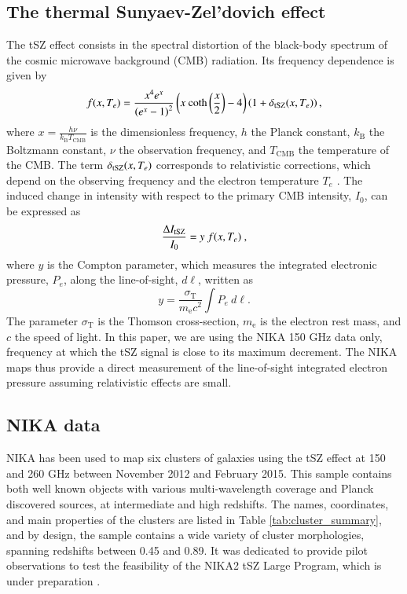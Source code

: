 \documentclass[twocolumn,traditabstract]{aa}
\begin{document}
\subsection{The thermal Sunyaev-Zel'dovich effect}
The tSZ effect consists in the spectral distortion of the black-body spectrum of the cosmic microwave background (CMB) radiation. Its frequency dependence is given by \citep{birkinshaw1999}
\begin{equation}
	f(x, T_e) = \frac{x^4 e^x}{\left(e^x-1\right)^2} \left(x \ \mathrm{coth}\left(\frac{x}{2}\right) - 4\right) \left(1 + \delta_{\rm tSZ}(x, T_e) \right),
	\label{eq:sz_f_x}
\end{equation}
where $x = \frac{h \nu}{k_{\mathrm{B}} T_{\mathrm{CMB}}}$ is the dimensionless frequency, $h$ the Planck constant, $k_{\mathrm{B}}$ the Boltzmann constant, $\nu$ the observation frequency, and $T_{\mathrm{CMB}}$ the temperature of the CMB. The term $\delta_{\rm tSZ}(x,T_e)$ corresponds to relativistic corrections, which depend on the observing frequency and the electron temperature $T_e$ \citep[see, e.g.][]{Itoh2003}. The induced change in intensity with respect to the primary CMB intensity, $I_0$, can be expressed as
\begin{equation}
	\frac{\Delta I_{\rm tSZ}}{I_0} = y \ f(x, T_e) \ ,
\label{eq:deltaI}
\end{equation}
where $y$ is the Compton parameter, which measures the integrated electronic pressure, $P_{e}$, along the line-of-sight, $d\ell$, written as
   \begin{equation}
	y = \frac{\sigma_{\mathrm{T}}}{m_{\mathrm{e}} c^2} \int P_{e} \ d\ell.
	\label{eq:y_compton}
   \end{equation}
The parameter $\sigma_{\mathrm{T}}$ is the Thomson cross-section, $m_{\mathrm{e}}$ is the electron rest mass, and $c$ the speed of light. In this paper, we are using the NIKA 150 GHz data only, frequency at which the tSZ signal is close to its maximum decrement. The NIKA maps thus provide a direct measurement of the line-of-sight integrated electron pressure assuming relativistic effects are small.

\subsection{NIKA data}\label{sec:NIKA_Data}
NIKA has been used to map six clusters of galaxies using the tSZ effect at 150 and 260 GHz between November 2012 and February 2015. This sample contains both well known objects with various multi-wavelength coverage and Planck discovered sources, at intermediate and high redshifts. The names, coordinates, and main properties of the clusters are listed in Table \ref{tab:cluster_summary}, and by design, the sample contains a wide variety of cluster morphologies, spanning redshifts between 0.45 and 0.89. It was dedicated to provide pilot observations to test the feasibility of the NIKA2 \citep{NIKA2017} tSZ Large Program, which is under preparation \citep{Comis2016,Mayet2017}. 
\end{document}

